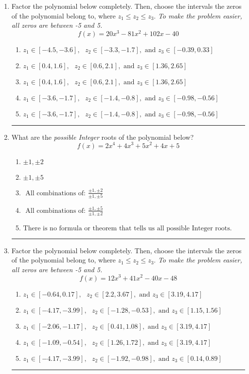 \documentclass[14pt]{extbook}
\newcommand{\litem}[1]{\item#1\hspace*{-1cm}\rule{\textwidth}{0.4pt}}
\begin{document}
\begin{enumerate}
\litem{
Factor the polynomial below completely. Then, choose the intervals the zeros of the polynomial belong to, where $z_1 \leq z_2 \leq z_3$. \textit{To make the problem easier, all zeros are between -5 and 5.}\[ f(x) = 20x^{3} -81 x^{2} +102 x -40 \]\begin{enumerate}[label=\Alph*.]
\item \( z_1 \in [-4.5, -3.6], \text{   }  z_2 \in [-3.3, -1.7], \text{   and   } z_3 \in [-0.39, 0.33] \)
\item \( z_1 \in [0.4, 1.6], \text{   }  z_2 \in [0.6, 2.1], \text{   and   } z_3 \in [1.36, 2.65] \)
\item \( z_1 \in [0.4, 1.6], \text{   }  z_2 \in [0.6, 2.1], \text{   and   } z_3 \in [1.36, 2.65] \)
\item \( z_1 \in [-3.6, -1.7], \text{   }  z_2 \in [-1.4, -0.8], \text{   and   } z_3 \in [-0.98, -0.56] \)
\item \( z_1 \in [-3.6, -1.7], \text{   }  z_2 \in [-1.4, -0.8], \text{   and   } z_3 \in [-0.98, -0.56] \)

\end{enumerate} }
\litem{
What are the \textit{possible Integer} roots of the polynomial below?\[ f(x) = 2x^{4} +4 x^{3} +5 x^{2} +4 x + 5 \]\begin{enumerate}[label=\Alph*.]
\item \( \pm 1,\pm 2 \)
\item \( \pm 1,\pm 5 \)
\item \( \text{ All combinations of: }\frac{\pm 1,\pm 2}{\pm 1,\pm 5} \)
\item \( \text{ All combinations of: }\frac{\pm 1,\pm 5}{\pm 1,\pm 2} \)
\item \( \text{There is no formula or theorem that tells us all possible Integer roots.} \)

\end{enumerate} }
\litem{
Factor the polynomial below completely. Then, choose the intervals the zeros of the polynomial belong to, where $z_1 \leq z_2 \leq z_3$. \textit{To make the problem easier, all zeros are between -5 and 5.}\[ f(x) = 12x^{3} +41 x^{2} -40 x -48 \]\begin{enumerate}[label=\Alph*.]
\item \( z_1 \in [-0.64, 0.17], \text{   }  z_2 \in [2.2, 3.67], \text{   and   } z_3 \in [3.19, 4.17] \)
\item \( z_1 \in [-4.17, -3.99], \text{   }  z_2 \in [-1.28, -0.53], \text{   and   } z_3 \in [1.15, 1.56] \)
\item \( z_1 \in [-2.06, -1.17], \text{   }  z_2 \in [0.41, 1.08], \text{   and   } z_3 \in [3.19, 4.17] \)
\item \( z_1 \in [-1.09, -0.54], \text{   }  z_2 \in [1.26, 1.72], \text{   and   } z_3 \in [3.19, 4.17] \)
\item \( z_1 \in [-4.17, -3.99], \text{   }  z_2 \in [-1.92, -0.98], \text{   and   } z_3 \in [0.14, 0.89] \)


\end{enumerate}}
\end{enumerate}
\end{document}
